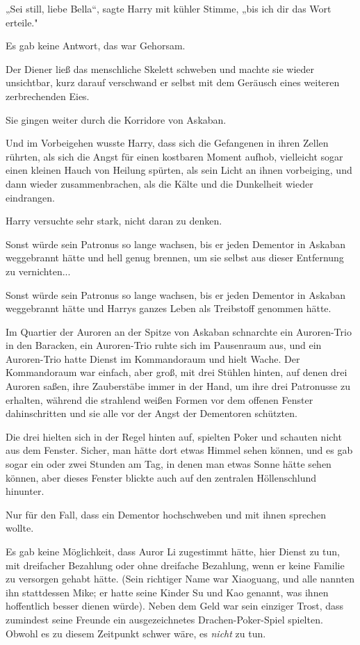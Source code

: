 {„Sei still, liebe Bella“, sagte Harry mit kühler Stimme, „bis ich dir das Wort erteile."

Es gab keine Antwort, das war Gehorsam.

Der Diener ließ das menschliche Skelett schweben und machte sie wieder unsichtbar, kurz darauf verschwand er selbst mit dem Geräusch eines weiteren zerbrechenden Eies.

Sie gingen weiter durch die Korridore von Askaban.

Und im Vorbeigehen wusste Harry, dass sich die Gefangenen in ihren Zellen rührten, als sich die Angst für einen kostbaren Moment aufhob, vielleicht sogar einen kleinen Hauch von Heilung spürten, als sein Licht an ihnen vorbeiging, und dann wieder zusammenbrachen, als die Kälte und die Dunkelheit wieder eindrangen.

Harry versuchte sehr stark, nicht daran zu denken.

Sonst würde sein Patronus so lange wachsen, bis er jeden Dementor in Askaban weggebrannt hätte und hell genug brennen, um sie selbst aus dieser Entfernung zu vernichten...

Sonst würde sein Patronus so lange wachsen, bis er jeden Dementor in Askaban weggebrannt hätte und Harrys ganzes Leben als Treibstoff genommen hätte.

Im Quartier der Auroren an der Spitze von Askaban schnarchte ein Auroren-Trio in den Baracken, ein Auroren-Trio ruhte sich im Pausenraum aus, und ein Auroren-Trio hatte Dienst im Kommandoraum und hielt Wache. Der Kommandoraum war einfach, aber groß, mit drei Stühlen hinten, auf denen drei Auroren saßen, ihre Zauberstäbe immer in der Hand, um ihre drei Patronusse zu erhalten, während die strahlend weißen Formen vor dem offenen Fenster dahinschritten und sie alle vor der Angst der Dementoren schützten.

Die drei hielten sich in der Regel hinten auf, spielten Poker und schauten nicht aus dem Fenster. Sicher, man hätte dort etwas Himmel sehen können, und es gab sogar ein oder zwei Stunden am Tag, in denen man etwas Sonne hätte sehen können, aber dieses Fenster blickte auch auf den zentralen Höllenschlund hinunter.

Nur für den Fall, dass ein Dementor hochschweben und mit ihnen sprechen wollte.

Es gab keine Möglichkeit, dass Auror Li zugestimmt hätte, hier Dienst zu tun, mit dreifacher Bezahlung oder ohne dreifache Bezahlung, wenn er keine Familie zu versorgen gehabt hätte. (Sein richtiger Name war Xiaoguang, und alle nannten ihn stattdessen Mike; er hatte seine Kinder Su und Kao genannt, was ihnen hoffentlich besser dienen würde). Neben dem Geld war sein einziger Trost, dass zumindest seine Freunde ein ausgezeichnetes Drachen-Poker-Spiel spielten. Obwohl es zu diesem Zeitpunkt schwer wäre, es \emph{nicht} zu tun.

}

